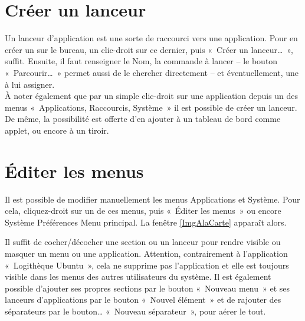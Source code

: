 \section{Créer un lanceur}
\label{RefLanceur}
Un lanceur d'application est une sorte de raccourci vers une application. Pour en créer un sur le bureau, un clic-droit sur ce dernier, puis «~Créer un lanceur\ldots{}~», suffit. Ensuite, il faut renseigner le Nom, la commande à lancer -- le bouton «~Parcourir\ldots{}~» permet aussi de le chercher directement -- et éventuellement, une  à lui assigner.\\
À noter également que par un simple clic-droit sur une application depuis un des menus «~Applications, Raccourcis, Système~» il est possible de créer un lanceur. De même, la possibilité est offerte d'en ajouter à un tableau de bord comme applet, ou encore à un tiroir.
\section{Éditer les menus}
\label{RefEditerMenus}
Il est possible de modifier manuellement les menus Applications et Système. Pour cela, cliquez-droit sur un de ces menus, puis «~Éditer les menus~» ou encore  Système \FlecheDroite Préférences \FlecheDroite Menu principal. La fenêtre \ref{ImgAlaCarte} apparaît alors.\par
{}
Il suffit de cocher/décocher une section ou un lanceur %
pour rendre visible ou masquer un menu ou une application. Attention, contrairement à l'application «~Logithèque Ubuntu~», cela ne supprime pas l'application et elle est toujours visible dans les menus des autres utilisateurs du système. Il est également possible d'ajouter ses propres sections par le bouton «~Nouveau menu~» et ses lanceurs d'applications par le bouton «~Nouvel élément~» et de rajouter des séparateurs par le bouton\ldots{} «~Nouveau séparateur~», pour aérer le tout.
